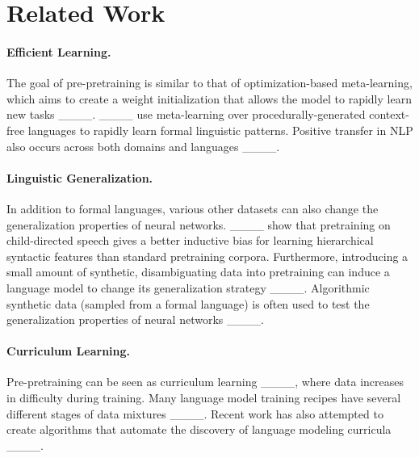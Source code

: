 \section{Related Work}
\paragraph{Efficient Learning.} The goal of pre-pretraining is similar to that of optimization-based meta-learning, which aims to create a weight initialization that allows the model to rapidly learn new tasks ____. ____ use meta-learning over procedurally-generated context-free languages to rapidly learn formal linguistic patterns. Positive transfer in NLP also occurs across both domains and languages ____. 

\paragraph{Linguistic Generalization.} In addition to formal languages, various other datasets can also change the generalization properties of neural networks. ____ show that pretraining on child-directed speech gives a better inductive bias for learning hierarchical syntactic features than standard pretraining corpora. Furthermore, introducing a small amount of synthetic, disambiguating data into pretraining can induce a language model to change its generalization strategy ____. Algorithmic synthetic data (sampled from a formal language) is often used to test the generalization properties of neural networks ____.

\paragraph{Curriculum Learning.} Pre-pretraining can be seen as curriculum learning ____, where data increases in difficulty during training. Many language model training recipes have several different stages of data mixtures ____. Recent work has also attempted to create algorithms that automate the discovery of language modeling curricula ____.